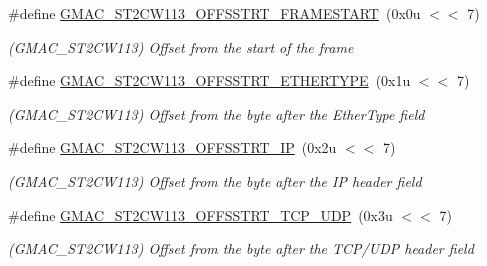 \begin{DoxyCompactItemize}
\item 
\mbox{\label{group__SAME70__GMAC_ga270a8023e0036da1054c834b36124234}} 
\#define \mbox{\hyperlink{group__SAME70__GMAC_ga270a8023e0036da1054c834b36124234}{G\+M\+A\+C\+\_\+\+S\+T2\+C\+W113\+\_\+\+O\+F\+F\+S\+S\+T\+R\+T\+\_\+\+F\+R\+A\+M\+E\+S\+T\+A\+RT}}~(0x0u $<$$<$ 7)
\begin{DoxyCompactList}\small\item\em (G\+M\+A\+C\+\_\+\+S\+T2\+C\+W113) Offset from the start of the frame \end{DoxyCompactList}\item 
\mbox{\label{group__SAME70__GMAC_ga68898ec381456064878d06df8f6f1204}} 
\#define \mbox{\hyperlink{group__SAME70__GMAC_ga68898ec381456064878d06df8f6f1204}{G\+M\+A\+C\+\_\+\+S\+T2\+C\+W113\+\_\+\+O\+F\+F\+S\+S\+T\+R\+T\+\_\+\+E\+T\+H\+E\+R\+T\+Y\+PE}}~(0x1u $<$$<$ 7)
\begin{DoxyCompactList}\small\item\em (G\+M\+A\+C\+\_\+\+S\+T2\+C\+W113) Offset from the byte after the Ether\+Type field \end{DoxyCompactList}\item 
\mbox{\label{group__SAME70__GMAC_ga0451725a2fe3ff07f65bd20053a1766c}} 
\#define \mbox{\hyperlink{group__SAME70__GMAC_ga0451725a2fe3ff07f65bd20053a1766c}{G\+M\+A\+C\+\_\+\+S\+T2\+C\+W113\+\_\+\+O\+F\+F\+S\+S\+T\+R\+T\+\_\+\+IP}}~(0x2u $<$$<$ 7)
\begin{DoxyCompactList}\small\item\em (G\+M\+A\+C\+\_\+\+S\+T2\+C\+W113) Offset from the byte after the IP header field \end{DoxyCompactList}\item 
\mbox{\label{group__SAME70__GMAC_ga105d0358e0c92f99e92590f9b77de2d8}} 
\#define \mbox{\hyperlink{group__SAME70__GMAC_ga105d0358e0c92f99e92590f9b77de2d8}{G\+M\+A\+C\+\_\+\+S\+T2\+C\+W113\+\_\+\+O\+F\+F\+S\+S\+T\+R\+T\+\_\+\+T\+C\+P\+\_\+\+U\+DP}}~(0x3u $<$$<$ 7)
\begin{DoxyCompactList}\small\item\em (G\+M\+A\+C\+\_\+\+S\+T2\+C\+W113) Offset from the byte after the T\+C\+P/\+U\+DP header field \end{DoxyCompactList}\item 
\mbox{\label{group__SAME70__GMAC_ga657749dca5b00645074d25c44f56f651}} 

\end{DoxyCompactItemize}
